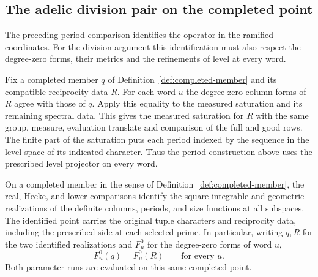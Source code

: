 \subsection{The adelic division pair on the completed point}
\label{subsec:completed-division}

The preceding period comparison identifies the operator in the ramified coordinates. For the division argument this identification must also respect the degree-zero forms, their metrics and the refinements of level at every word.

Fix a completed member \(q\) of Definition~\ref{def:completed-member}
and its compatible reciprocity data \(R\). For each word \(u\) the
degree-zero column forms of \(R\) agree with those of \(q\). Apply this equality to the measured
saturation and its remaining spectral data. This gives the
measured saturation for \(R\) with the same group, measure,
evaluation translate and comparison of the full and good rows.
The finite part of the saturation puts each period indexed by the sequence in the
level space of its indicated character. Thus the period
construction above uses the prescribed level projector on
every word.

\begin{proposition}\label{prop:completed-division-pair}
On a completed member in the sense of Definition~\ref{def:completed-member}, the real, Hecke, and lower
comparisons identify the square-integrable and geometric
realizations of the definite columns, periods, and size
functions at all subspaces. The identified point carries
the original tuple characters and reciprocity data,
including the prescribed side at each selected prime.
In particular, writing \(q,R\) for the two identified realizations and \(F_u^0\) for the degree-zero forms of word \(u\),
\[
 F_u^0(q)=F_u^0(R)\qquad\text{for every }u.
\]
Both parameter runs are evaluated on this same completed point.
\end{proposition}

